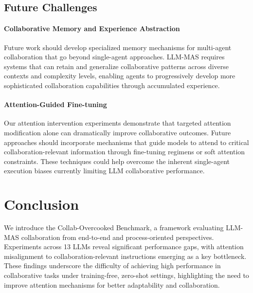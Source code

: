 \documentclass[11pt]{article}
\begin{document}
\subsection{Future Challenges}
\paragraph{Collaborative Memory and Experience Abstraction}
Future work should develop specialized memory mechanisms for multi-agent collaboration that go beyond single-agent approaches. LLM-MAS requires systems that can retain and generalize collaborative patterns across diverse contexts and complexity levels, enabling agents to progressively develop more sophisticated collaboration capabilities through accumulated experience.

\paragraph{Attention-Guided Fine-tuning}
Our attention intervention experiments demonstrate that targeted attention modification alone can dramatically improve collaborative outcomes. Future approaches should incorporate mechanisms that guide models to attend to critical collaboration-relevant information through fine-tuning regimens or soft attention constraints. These techniques could help overcome the inherent single-agent execution biases currently limiting LLM collaborative performance.





\section{Conclusion}


We introduce the Collab-Overcooked Benchmark, a framework evaluating LLM-MAS collaboration from end-to-end and process-oriented perspectives. Experiments across 13 LLMs reveal significant performance gaps, with attention misalignment to collaboration-relevant instructions emerging as a key bottleneck. These findings underscore the difficulty of achieving high performance in collaborative tasks under training-free, zero-shot settings, highlighting the need to improve attention mechanisms for better adaptability and collaboration.



\end{document}
